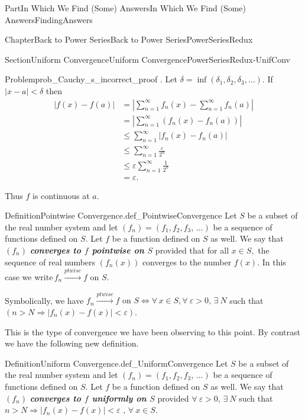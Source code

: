 \documentclass[oneside,10pt,]{book}
\newcommand{\alert}[1]{\textbf{\textit{#1}}}
\numberwithin{equation}{part}
\newcommand{\abs}[1]{\left|#1\right|}
\newcommand{\eps}{\varepsilon}
\newcommand{\ptwise}{\stackrel{ptwise}{\longrightarrow}}
\newcommand{\lt}{<}
\newcommand{\amp}{&}
\begin{document}
\begin{partptx}{Part}{In Which We Find (Some) Answers}{}{In Which We Find (Some) Answers}{}{}{FindingAnswers}
\begin{chapterptx}{Chapter}{Back to Power Series}{}{Back to Power Series}{}{}{PowerSeriesRedux}
\begin{sectionptx}{Section}{Uniform Convergence}{}{Uniform Convergence}{}{}{PowerSeriesRedux-UnifConv}
\begin{problem}{Problem}{}{prob_Cauchy_s_incorrect_proof}
\frac{\eps}{2^n}\).  Let \(\delta=\inf(\delta_1,\delta_2,\delta_3,\ldots)\).  If \(\abs{x-a}\lt \delta\) then%
\begin{align*}
\abs{f(x)-f(a)} \amp =  \abs{\sum_{n=1}^\infty f_n(x)  -  \sum_{n=1}^\infty f_n(a) }\\
\amp = \abs{\sum_{n=1}^\infty \left(f_n(x)-f_n(a)\right) }\\
\amp \le \sum_{n=1}^\infty \abs{f_n(x)-f_n(a) }\\
\amp \le \sum_{n=1}^\infty \frac{\eps}{2^n}\\
\amp \le \eps\sum_{n=1}^\infty \frac{1}{2^n}\\
\amp =   \eps.
\end{align*}
%
\par
Thus \(f\) is continuous at \(a\).%
\end{problem}
\begin{definition}{Definition}{Pointwise Convergence.}{def_PointwiseConvergence}%
%
%
%
Let \(S\) be a subset of the real number system and let \(\left(f_n\right)=\left(f_1,f_2,f_3,\,\ldots\right)\) be a sequence of functions defined on \(S\).  Let \(f\) be a function defined on \(S\) as well.  We say that \(\left(f_n\right)\) \alert{converges to \(f\) pointwise on \(S\)} provided that for all \(x\in
S,\) the sequence of real numbers \(\left(f_n(x)\right)\) converges to the number \(f(x)\).  In this case we write\(\,f_n\ptwise f\) on \(S\).%
\end{definition}
Symbolically, we have \(f_n\ptwise f\text{ on }
S\Leftrightarrow \forall\,x\in S,\forall\ \eps>0,\,\exists\
N\) such that \(\left(n>N \Rightarrow|f_n(x)-f(x)|\lt
\eps\right)\).%
\par
This is the type of convergence we have been observing to this point.  By contrast we have the following new definition.%
\begin{definition}{Definition}{Uniform Convergence.}{def_UniformConvergence}%
\index{Uniform Convergence}%
%
%
Let \(S\) be a subset of the real number system and let \(\left(f_n\right)=\left(f_1,f_2,f_3,\,\ldots\right)\) be a sequence of functions defined on \(S\).  Let \(f\) be a function defined on \(S\) as well.  We say that \(\left(f_n\right)\) \alert{converges to \(f\) uniformly on \(S\)} provided \(\forall\
\eps>0,\,\exists\ N\) such that \(n>N\Rightarrow|f_n(x)-f(x)|\lt \eps\text{ , } \forall\
x\in S\).%
\par

\end{definition}
\end{sectionptx}
\end{chapterptx}
\end{partptx}
\end{document}
